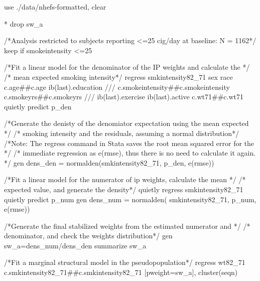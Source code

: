 \documentclass[
  10pt,
  a4paper,
]{book}
\newenvironment{Shaded}{\begin{snugshade}}{\end{snugshade}}
\newcommand{\CommentTok}[1]{\textcolor[rgb]{0.37,0.37,0.37}{#1}}
\newcommand{\FunctionTok}[1]{\textcolor[rgb]{0.28,0.35,0.67}{#1}}
\newcommand{\KeywordTok}[1]{\textcolor[rgb]{0.00,0.46,0.62}{#1}}
\newcommand{\NormalTok}[1]{\textcolor[rgb]{0.00,0.46,0.62}{#1}}
\begin{document}
\begin{Shaded}
\begin{Highlighting}[]
\KeywordTok{use}\NormalTok{ ./}\KeywordTok{data}\NormalTok{/nhefs{-}formatted, }\KeywordTok{clear}

\NormalTok{* }\KeywordTok{drop}\NormalTok{ sw\_a}

\CommentTok{/*Analysis restricted to subjects reporting \textless{}=25 cig/day at baseline: N = 1162*/}
\KeywordTok{keep} \KeywordTok{if}\NormalTok{ smokeintensity \textless{}=25}

\CommentTok{/*Fit a linear model for the denominator of the IP weights and calculate the */}
\CommentTok{/* mean expected smoking intensity*/} 
\KeywordTok{regress}\NormalTok{ smkintensity82\_71 sex race c.age\#\#c.age ib(}\FunctionTok{last}\NormalTok{).education }\CommentTok{///}
\NormalTok{c.smokeintensity\#\#c.smokeintensity c.smokeyrs\#\#c.smokeyrs }\CommentTok{///}
\NormalTok{ib(}\FunctionTok{last}\NormalTok{).exercise ib(}\FunctionTok{last}\NormalTok{).active c.wt71\#\#c.wt71}
\KeywordTok{quietly} \KeywordTok{predict}\NormalTok{ p\_den}

\CommentTok{/*Generate the denisty of the denomiator expectation using the mean expected */}
\CommentTok{/* smoking intensity and the residuals, assuming a normal distribution*/}
\CommentTok{/*Note: The regress command in Stata saves the root mean squared error for the */}
\CommentTok{/* immediate regression as e(rmse), thus there is no need to calculate it again. */}
\KeywordTok{gen}\NormalTok{ dens\_den = }\FunctionTok{normalden}\NormalTok{(smkintensity82\_71, p\_den, }\FunctionTok{e}\NormalTok{(rmse))}

\CommentTok{/*Fit a linear model for the numerator of ip weights, calculate the mean */}
\CommentTok{/* expected value, and generate the density*/}
\KeywordTok{quietly} \KeywordTok{regress}\NormalTok{ smkintensity82\_71}
\KeywordTok{quietly} \KeywordTok{predict}\NormalTok{ p\_num}
\KeywordTok{gen}\NormalTok{ dens\_num = }\FunctionTok{normalden}\NormalTok{( smkintensity82\_71, p\_num, }\FunctionTok{e}\NormalTok{(rmse))}

\CommentTok{/*Generate the final stabilized weights from the estimated numerator and */}
\CommentTok{/* denominator, and check the weights distribution*/}
\KeywordTok{gen}\NormalTok{ sw\_a=dens\_num/dens\_den}
\KeywordTok{summarize}\NormalTok{ sw\_a}

\CommentTok{/*Fit a marginal structural model in the pseudopopulation*/}
\KeywordTok{regress}\NormalTok{ wt82\_71  c.smkintensity82\_71\#\#c.smkintensity82\_71 [}\KeywordTok{pweight}\NormalTok{=sw\_a], }\KeywordTok{cluster}\NormalTok{(seqn)}


\end{Highlighting}
\end{Shaded}
\end{document}

